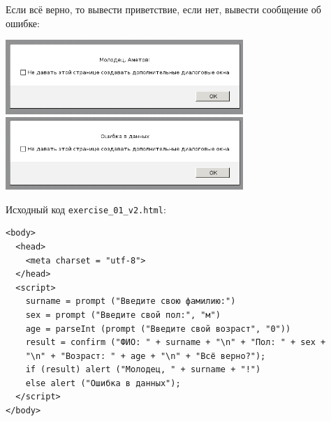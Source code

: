 Если всё верно, то вывести приветствие, если нет, вывести сообщение об ошибке:

\begin{center} 
  \includegraphics[width=9cm]{img/06.png}
  \includegraphics[width=9cm]{img/07.png}
\end{center}

Исходный код \verb|exercise_01_v2.html|:
\begin{verbatim}
<body>
  <head>
    <meta charset = "utf-8">
  </head>
  <script>
    surname = prompt ("Введите свою фамилию:")
    sex = prompt ("Введите свой пол:", "м")
    age = parseInt (prompt ("Введите свой возраст", "0"))
    result = confirm ("ФИО: " + surname + "\n" + "Пол: " + sex +
    "\n" + "Возраст: " + age + "\n" + "Всё верно?");
    if (result) alert ("Молодец, " + surname + "!")
    else alert ("Ошибка в данных");
  </script>
</body>
\end{verbatim}
